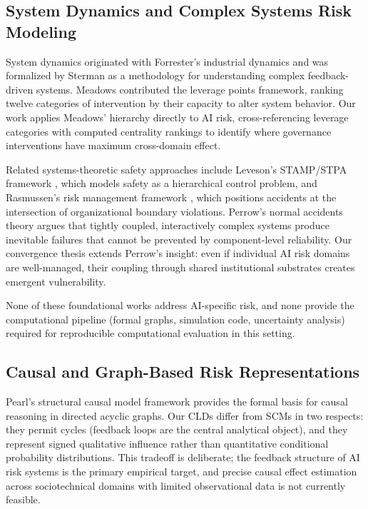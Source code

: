 \documentclass[11pt]{article}
\begin{document}
\subsection{System Dynamics and Complex Systems Risk Modeling}

System dynamics originated with Forrester's industrial dynamics \citep{forrester1961} and was formalized by Sterman \citep{sterman2000} as a methodology for understanding complex feedback-driven systems. Meadows \citep{meadows2008} contributed the leverage points framework, ranking twelve categories of intervention by their capacity to alter system behavior. Our work applies Meadows' hierarchy directly to AI risk, cross-referencing leverage categories with computed centrality rankings to identify where governance interventions have maximum cross-domain effect.

Related systems-theoretic safety approaches include Leveson's STAMP/STPA framework \citep{leveson2011}, which models safety as a hierarchical control problem, and Rasmussen's risk management framework \citep{rasmussen1997}, which positions accidents at the intersection of organizational boundary violations. Perrow's normal accidents theory \citep{perrow1984} argues that tightly coupled, interactively complex systems produce inevitable failures that cannot be prevented by component-level reliability. Our convergence thesis extends Perrow's insight: even if individual AI risk domains are well-managed, their coupling through shared institutional substrates creates emergent vulnerability.

None of these foundational works address AI-specific risk, and none provide the computational pipeline (formal graphs, simulation code, uncertainty analysis) required for reproducible computational evaluation in this setting.

\subsection{Causal and Graph-Based Risk Representations}

Pearl's structural causal model framework \citep{pearl2009} provides the formal basis for causal reasoning in directed acyclic graphs. Our CLDs differ from SCMs in two respects: they permit cycles (feedback loops are the central analytical object), and they represent signed qualitative influence rather than quantitative conditional probability distributions. This tradeoff is deliberate; the feedback structure of AI risk systems is the primary empirical target, and precise causal effect estimation across sociotechnical domains with limited observational data is not currently feasible.
\end{document}
